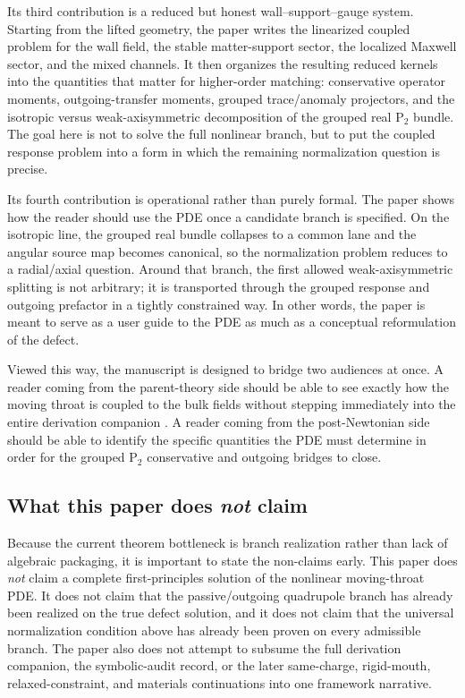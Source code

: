 \documentclass[11pt]{article}
\theoremstyle{definition}
\newcommand{\Ptwo}{\ensuremath{\mathrm{P}_2}}
\begin{document}
Its third contribution is a reduced but honest wall--support--gauge system. Starting from the lifted geometry, the paper writes the linearized coupled problem for the wall field, the stable matter-support sector, the localized Maxwell sector, and the mixed channels. It then organizes the resulting reduced kernels into the quantities that matter for higher-order matching: conservative operator moments, outgoing-transfer moments, grouped trace/anomaly projectors, and the isotropic versus weak-axisymmetric decomposition of the grouped real $\Ptwo$ bundle. The goal here is not to solve the full nonlinear branch, but to put the coupled response problem into a form in which the remaining normalization question is precise.

Its fourth contribution is operational rather than purely formal. The paper shows how the reader should use the PDE once a candidate branch is specified. On the isotropic line, the grouped real bundle collapses to a common lane and the angular source map becomes canonical, so the normalization problem reduces to a radial/axial question. Around that branch, the first allowed weak-axisymmetric splitting is not arbitrary; it is transported through the grouped response and outgoing prefactor in a tightly constrained way. In other words, the paper is meant to serve as a user guide to the PDE as much as a conceptual reformulation of the defect.

Viewed this way, the manuscript is designed to bridge two audiences at once. A reader coming from the parent-theory side should be able to see exactly how the moving throat is coupled to the bulk fields without stepping immediately into the entire derivation companion \cite{Norris2026PDELedger}. A reader coming from the post-Newtonian side should be able to identify the specific quantities the PDE must determine in order for the grouped $\Ptwo$ conservative and outgoing bridges to close.

\subsection{What this paper does \emph{not} claim}

Because the current theorem bottleneck is branch realization rather than lack of algebraic packaging, it is important to state the non-claims early. This paper does \emph{not} claim a complete first-principles solution of the nonlinear moving-throat PDE. It does not claim that the passive/outgoing quadrupole branch has already been realized on the true defect solution, and it does not claim that the universal normalization condition above has already been proven on every admissible branch. The paper also does not attempt to subsume the full derivation companion, the symbolic-audit record, or the later same-charge, rigid-mouth, relaxed-constraint, and materials continuations into one framework narrative.
\end{document}
